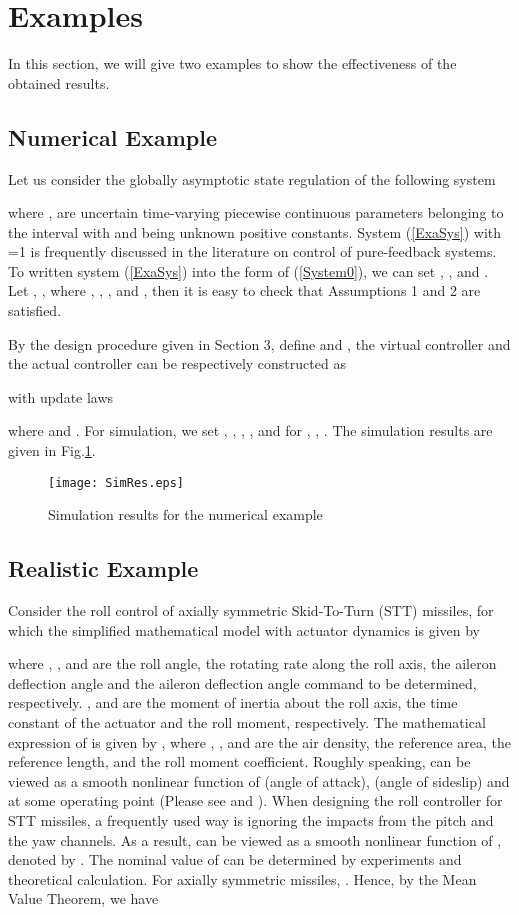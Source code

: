 \documentclass{tSYS2e}
\theoremstyle{plain}
\theoremstyle{definition}
\begin{document}
\section{Examples}
In this section, we will give two examples to show the effectiveness
of the obtained results.

\subsection{Numerical Example}
Let us consider the globally asymptotic state regulation of the following system

where ,  are uncertain time-varying piecewise continuous parameters belonging to the interval 
with  and  being unknown positive constants. System (\ref{ExaSys}) with =1 is
frequently discussed in the literature on control of pure-feedback systems.
To written system (\ref{ExaSys}) into the form of (\ref{System0}), we can set , ,  and . Let , , where , , ,  and ,
then it is easy to check that Assumptions 1 and 2 are satisfied.

By the design procedure given in Section 3, define  and , the virtual controller and the actual controller can
be respectively constructed as

with update laws

where  and . For simulation, we set 
, , , , and for , , .
The simulation results are given in Fig.\ref{fig1}.

\begin{figure}[!htb]
  \centering
  \texttt{[image: SimRes.eps]}
  \caption{Simulation results for the numerical example}
  \label{fig1}
\end{figure}

\subsection{Realistic Example}

Consider the roll control of axially symmetric Skid-To-Turn (STT)
missiles, for which the simplified mathematical model with actuator dynamics is given by

where , ,  and  are the roll angle, the rotating rate along the
roll axis, the aileron deflection angle and the aileron deflection angle
command to be determined, respectively. ,  and  are the moment of inertia about the roll axis, the time constant of the actuator and the roll moment, respectively. The mathematical expression of  is given
by , where , ,  and  are the air density, the reference area, the reference length, and  the roll
moment coefficient. Roughly speaking,  can be viewed as a smooth
nonlinear function of  (angle of attack),  (angle of sideslip) and  at some operating point
(Please see \cite{Siouris2004} and \cite{Hou2013}). When designing the roll controller for STT missiles, a
frequently used way is ignoring the impacts from the pitch and the yaw
channels. As a result,  can be viewed as a smooth nonlinear function of , denoted by . The nominal value of  can be determined by experiments and theoretical
calculation. For axially symmetric missiles, . Hence, by the
Mean Value Theorem, we have
\end{document}
